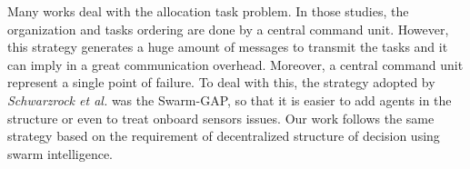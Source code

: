 Many works \cite{ferreira2007swarm,scerri2005allocatingLADCOP, ferreira2010robocup,ikemoto2010adaptive} deal with the allocation task problem. In those studies, the organization and tasks ordering are done by a central command unit. However, this strategy generates a huge amount of messages to transmit the tasks and it can imply in a great communication overhead. Moreover, a central command unit represent a single point of failure. To deal with this, the strategy adopted by \textit{Schwarzrock et al.}\cite{MAS07} was the Swarm-GAP, so that it is easier to add agents in the structure or even to treat onboard sensors issues. Our work follows the same strategy based on the requirement of decentralized structure of decision using swarm intelligence.